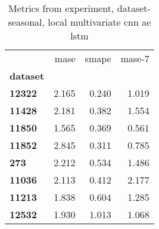 \begin{table}[h]
\centering
\caption{Metrics from experiment, dataset-seasonal, local multivariate cnn ae lstm}
\label{table:local-multivariate-cnn-ae-lstm-dataset-seasonal}
\begin{tabular}{lrrr}
\toprule
{} &   mase &  smape &  mase-7 \\
\textbf{dataset} &        &        &         \\
\midrule
\textbf{12322  } &  2.165 &  0.240 &   1.019 \\
\textbf{11428  } &  2.181 &  0.382 &   1.554 \\
\textbf{11850  } &  1.565 &  0.369 &   0.561 \\
\textbf{11852  } &  2.845 &  0.311 &   0.785 \\
\textbf{273    } &  2.212 &  0.534 &   1.486 \\
\textbf{11036  } &  2.113 &  0.412 &   2.177 \\
\textbf{11213  } &  1.838 &  0.604 &   1.285 \\
\textbf{12532  } &  1.930 &  1.013 &   1.068 \\
\bottomrule
\end{tabular}
\end{table}
